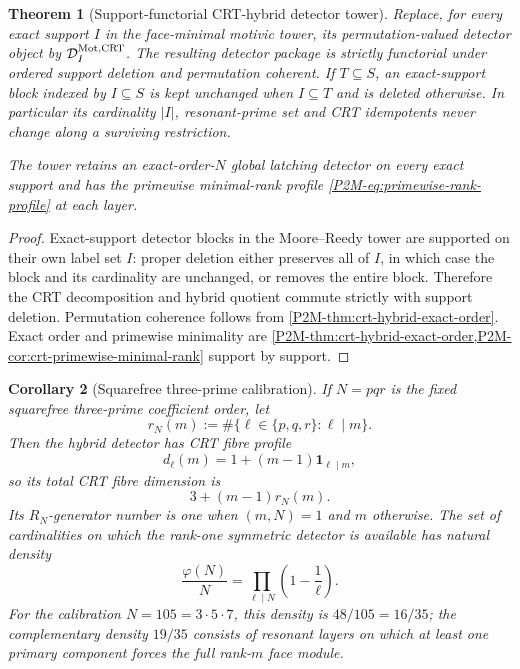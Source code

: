 \documentclass[11pt]{article}
\newtheorem{theorem}{Theorem}[section]
\newtheorem{corollary}[theorem]{Corollary}
\theoremstyle{remark}
\newcommand{\Mot}{\mathrm{Mot}}
\begin{document}
\begin{theorem}[Support-functorial CRT-hybrid detector tower]
\label{P2M-thm:crt-hybrid-support-tower}
Replace, for every exact support \(I\) in the face-minimal motivic tower, its
permutation-valued detector object by
\(\mathcal D_I^{\Mot,\rm CRT}\).  The resulting detector package is strictly
functorial under ordered support deletion and permutation coherent.  If
\(T\subseteq S\), an exact-support block indexed by \(I\subseteq S\) is kept
unchanged when \(I\subseteq T\) and is deleted otherwise.  In particular its
cardinality \(|I|\), resonant-prime set and CRT idempotents never change along
a surviving restriction.

The tower retains an exact-order-\(N\) global latching detector on every exact
support and has the primewise minimal-rank profile
\eqref{P2M-eq:primewise-rank-profile} at each layer.
\end{theorem}

\begin{proof}
Exact-support detector blocks in the Moore--Reedy tower are supported on their
own label set \(I\): proper deletion either preserves all of \(I\), in which
case the block and its cardinality are unchanged, or removes the entire block.
Therefore the CRT decomposition and hybrid quotient commute strictly with
support deletion.  Permutation coherence follows from
\cref{P2M-thm:crt-hybrid-exact-order}.  Exact order and primewise minimality are
\cref{P2M-thm:crt-hybrid-exact-order,P2M-cor:crt-primewise-minimal-rank} support by
support.
\end{proof}


\begin{corollary}[Squarefree three-prime calibration]
\label{P2M-cor:three-prime-hybrid-calibration}
If \(N=pqr\) is the fixed squarefree three-prime coefficient order, let
\[
 r_N(m):=\#\{\ell\in\{p,q,r\}:\ell\mid m\}.
\]
Then the hybrid detector has CRT fibre profile
\[
 d_\ell(m)=1+(m-1)\mathbf1_{\ell\mid m},
\]
so its total CRT fibre dimension is
\begin{equation}
 \boxed{3+(m-1)r_N(m).}
\end{equation}
Its \(R_N\)-generator number is one when \((m,N)=1\) and \(m\) otherwise.
The set of cardinalities on which the rank-one symmetric detector is available
has natural density
\begin{equation}
 \boxed{\frac{\varphi(N)}{N}
 =\prod_{\ell\mid N}\left(1-\frac1\ell\right).}
\end{equation}
For the calibration \(N=105=3\cdot5\cdot7\), this density is
\(48/105=16/35\); the complementary density \(19/35\) consists of resonant
layers on which at least one primary component forces the full rank-\(m\)
face module.
\end{corollary}
\end{document}
